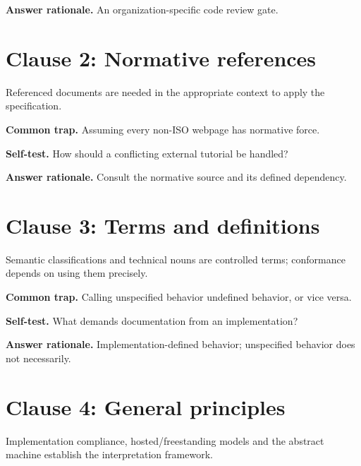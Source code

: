 \documentclass[11pt]{article}
\begin{document}
\textbf{Answer rationale.} An organization-specific code review gate.

\section{Clause 2: Normative references}
Referenced documents are needed in the appropriate context to apply the specification.

\textbf{Common trap.} Assuming every non-ISO webpage has normative force.

\textbf{Self-test.} How should a conflicting external tutorial be handled?

\textbf{Answer rationale.} Consult the normative source and its defined dependency.

\section{Clause 3: Terms and definitions}
Semantic classifications and technical nouns are controlled terms; conformance depends on using them precisely.

\textbf{Common trap.} Calling unspecified behavior undefined behavior, or vice versa.

\textbf{Self-test.} What demands documentation from an implementation?

\textbf{Answer rationale.} Implementation-defined behavior; unspecified behavior does not necessarily.

\section{Clause 4: General principles}
Implementation compliance, hosted/freestanding models and the abstract machine establish the interpretation framework.
\end{document}
